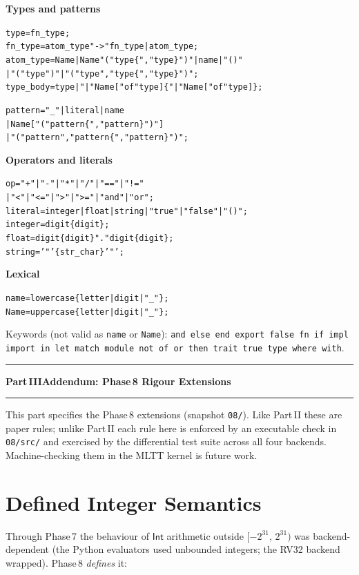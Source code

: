 \documentclass[10pt,a4paper]{article}
\newcommand{\TInt}{\mathsf{Int}}
\theoremstyle{plain}
\theoremstyle{definition}
\theoremstyle{remark}
\begin{document}
\medskip\noindent\textbf{Types and patterns}
{\small\begin{alltt}
type      = fn_type ;
fn_type   = atom_type "->" fn_type | atom_type ;
atom_type = Name | Name "(" type \{ "," type \} ")" | name | "()"
          | "(" type ")" | "(" type "," type \{ "," type \} ")" ;
type_body = type | "|" Name [ "of" type ] \{ "|" Name [ "of" type ] \} ;

pattern   = "_" | literal | name
          | Name [ "(" pattern \{ "," pattern \} ")" ]
          | "(" pattern "," pattern \{ "," pattern \} ")" ;
\end{alltt}}

\medskip\noindent\textbf{Operators and literals}
{\small\begin{alltt}
op      = "+" | "-" | "*" | "/" | "==" | "!="
        | "<" | "<=" | ">" | ">=" | "and" | "or" ;
literal = integer | float | string | "true" | "false" | "()" ;
integer = digit \{ digit \} ;
float   = digit \{ digit \} "." digit \{ digit \} ;
string  = '"' \{ str_char \} '"' ;
\end{alltt}}

\medskip\noindent\textbf{Lexical}
{\small\begin{alltt}
name = lowercase \{ letter | digit | "_" \} ;
Name = uppercase \{ letter | digit | "_" \} ;
\end{alltt}}
\noindent Keywords (not valid as \texttt{name} or \texttt{Name}):
\texttt{and else end export false fn if impl import in let match
module not of or then trait true type where with}.

\bigskip
\noindent\rule{\linewidth}{0.4pt}
{\centering\normalsize\bfseries Part\,III\quad Addendum: Phase\,8 Rigour Extensions\par}
\noindent\rule{\linewidth}{0.4pt}\medskip

\noindent
This part specifies the Phase\,8 extensions (snapshot \texttt{08/}).  Like
Part\,II these are paper rules; unlike Part\,II each rule here is enforced by
an executable check in \texttt{08/src/} and exercised by the differential
test suite across all four backends.  Machine-checking them in the MLTT
kernel is future work.

\section{Defined Integer Semantics}
\label{sec:int-defined}

Through Phase\,7 the behaviour of $\TInt$ arithmetic outside
$[-2^{31},\,2^{31})$ was backend-dependent (the Python evaluators used
unbounded integers; the RV32 backend wrapped).  Phase\,8 \emph{defines} it:
\end{document}
